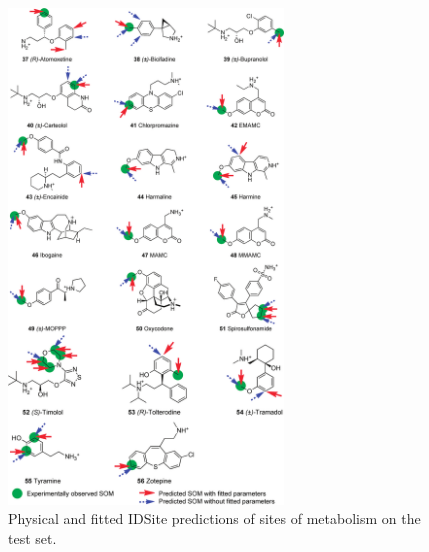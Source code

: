 \begin{figure}
\centering
\includegraphics[width=0.65\textwidth]{figures/idsite/idsite_figure-009.png}
\caption{Physical and fitted IDSite predictions of sites of metabolism on the test set.}
\label{fig:idsite_test}
\end{figure}
